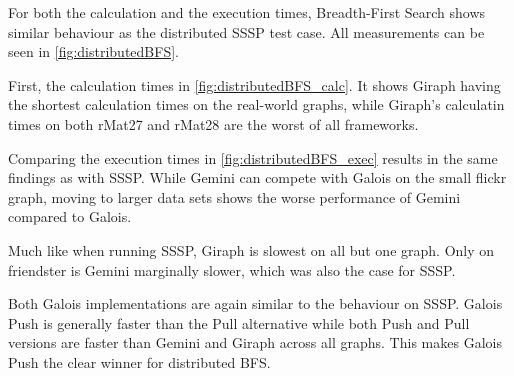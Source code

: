 For both the calculation and the execution times, Breadth-First Search shows similar behaviour as the distributed SSSP test case. All measurements can be seen in \autoref{fig:distributedBFS}.

First, the calculation times in \autoref{fig:distributedBFS_calc}. It shows Giraph having the shortest calculation times on the real-world graphs, while Giraph's calculatin times on both rMat27 and rMat28 are the worst of all frameworks. 

Comparing the execution times in \autoref{fig:distributedBFS_exec} results in the same findings as with SSSP. 
While Gemini can compete with Galois on the small flickr graph, moving to larger data sets shows the worse performance of Gemini compared to Galois.

Much like when running SSSP, Giraph is slowest on all but one graph. Only on friendster is Gemini marginally slower, which was also the case for SSSP.

Both Galois implementations are again similar to the behaviour on SSSP.
Galois Push is generally faster than the Pull alternative while both Push and Pull versions are faster than Gemini and Giraph across all graphs.
This makes Galois Push the clear winner for distributed BFS.

